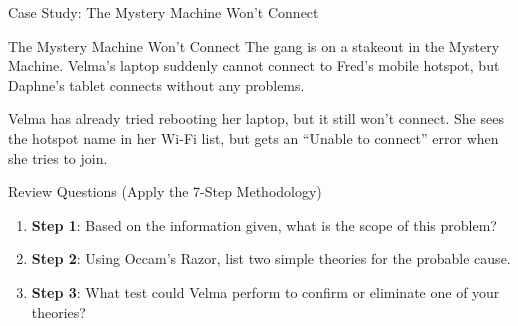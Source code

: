 \documentclass[aspectratio=169]{beamer}  %
\begin{document}
\begin{frame}{Case Study: The Mystery Machine Won't Connect}
    \begin{casestudy}{The Mystery Machine Won't Connect}
        The gang is on a stakeout in the Mystery Machine. Velma's laptop suddenly cannot connect to Fred's mobile hotspot, but Daphne's tablet connects without any problems.
        
        \vspace{0.5em}
        Velma has already tried rebooting her laptop, but it still won't connect. She sees the hotspot name in her Wi-Fi list, but gets an ``Unable to connect'' error when she tries to join.
    \end{casestudy}
    
    \begin{block}{Review Questions (Apply the 7-Step Methodology)}
        \begin{enumerate}
            \item \textbf{Step 1}: Based on the information given, what is the scope of this problem?
            \item \textbf{Step 2}: Using Occam's Razor, list two simple theories for the probable cause.
            \item \textbf{Step 3}: What test could Velma perform to confirm or eliminate one of your theories?
        \end{enumerate}
    \end{block}
\end{frame}
\end{document}
